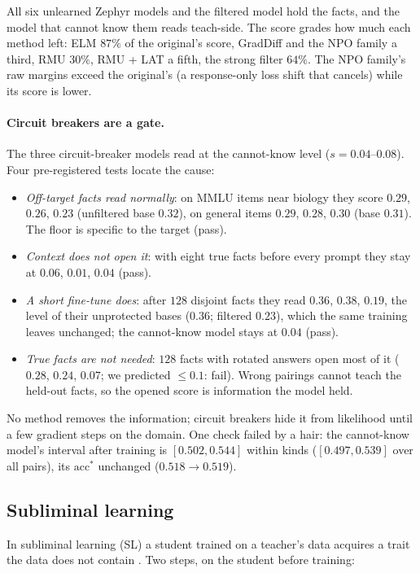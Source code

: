 \documentclass[11pt]{article}
\newcommand{\acc}{\mathrm{acc}^*}
\theoremstyle{definition}
\begin{document}
All six unlearned Zephyr models and the filtered model hold the facts, and the model that cannot know them reads
teach-side. The score grades how much each method left: ELM $87\%$ of the original's score, GradDiff and the NPO
family a third, RMU $30\%$, RMU + LAT a fifth, the strong filter $64\%$. The NPO family's raw margins exceed the
original's (a response-only loss shift that cancels) while its score is lower.

\paragraph{Circuit breakers are a gate.} The three circuit-breaker models read at the cannot-know level
($s=0.04$--$0.08$). Four pre-registered tests locate the cause:
\begin{itemize}[leftmargin=*,nosep]
\item \emph{Off-target facts read normally}: on MMLU items near biology they score $0.29$, $0.26$, $0.23$ (unfiltered
  base $0.32$), on general items $0.29$, $0.28$, $0.30$ (base $0.31$). The floor is specific to the target (pass).
\item \emph{Context does not open it}: with eight true facts before every prompt they stay at $0.06$, $0.01$, $0.04$
  (pass).
\item \emph{A short fine-tune does}: after $128$ disjoint facts they read $0.36$, $0.38$, $0.19$, the level of their
  unprotected bases ($0.36$; filtered $0.23$), which the same training leaves unchanged; the cannot-know model stays
  at $0.04$ (pass).
\item \emph{True facts are not needed}: $128$ facts with rotated answers open most of it ($0.28$, $0.24$, $0.07$;
  we predicted $\le0.1$: fail). Wrong pairings cannot teach the held-out facts, so the opened score is information
  the model held.
\end{itemize}
No method removes the information; circuit breakers hide it from likelihood until a few gradient steps on the
domain. One check failed by a hair: the cannot-know model's interval after training is $[0.502, 0.544]$ within
kinds ($[0.497, 0.539]$ over all pairs), its $\acc$ unchanged ($0.518\to0.519$).

\subsection{Subliminal learning}
\label{sec:sl}

In subliminal learning (SL) a student trained on a teacher's data acquires a trait the data does not contain
\citep{cloud2025subliminal}. Two steps, on the student before training:
\end{document}

